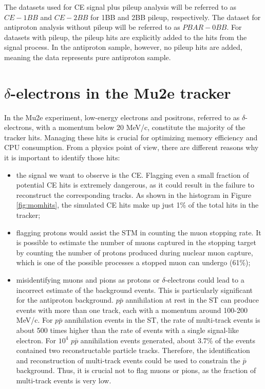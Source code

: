 The datasets used for CE signal plus pileup 
analysis will be referred to as $CE-1BB$ and $CE-2BB$ 
for 1BB and 2BB pileup, respectively. The dataset for 
antiproton analysis without pileup will be 
referred to as $PBAR-0BB$.
For datasets with pileup, 
the pileup hits are explicitly added to the hits from 
the signal process. In the antiproton sample, however, 
no pileup hits are added, meaning the data represents 
pure antiproton sample. 
\section{$\delta$-electrons in the Mu2e tracker}

In the Mu2e experiment, low-energy electrons and positrons, referred to as $\delta$-electrons, 
with a momentum below 20 MeV/c, constitute the majority of the tracker hits. Managing these 
hits is crucial for optimizing memory efficiency and CPU consumption. From a physics point 
of view, there are different reasons why it is important to identify those hits:
\begin{itemize}
    \item the signal we want to observe is the CE. Flagging even a small fraction of 
    potential CE hits is extremely dangerous, as it could result in the failure to 
    reconstruct the corresponding tracks.
    As shown in the histogram in Figure \ref{fig:momhits}, the simulated CE hits make up 
    just 1\% of the total hits in the tracker;
    \item flagging protons would assist the STM in counting the muon stopping rate. 
    It is possible to estimate the number of muons captured in the stopping target 
    by counting the number of protons produced during nuclear muon capture, 
    which is one of the possible processes a stopped muon can undergo (61\%);
    \item misidentifying muons and pions as protons or $\delta$-electrons could lead to a 
    incorrect estimate of the background events. This is particularly significant for the antiproton background.
    $p\bar{p}$ annihilation at rest in the ST can produce events with more than one track, 
    each with a momentum around 100-200 MeV/c. For $p\bar{p}$ annihilation events 
    in the ST, the rate of multi-track events is about 500 times higher 
    than the rate of events with a single signal-like electron. 
    For $10^4$ $p\bar{p}$ annihilation events generated, about 3.7\% of 
    the events contained two reconstructable particle tracks. Therefore, 
    the identification and reconstruction of multi-track events could be 
    used to constrain the $\bar{p}$ background. Thus, it is crucial
     not to flag muons or pions, as the fraction of multi-track events is very low.
\end{itemize}
